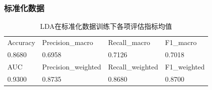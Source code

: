 \documentclass[10pt]{article}
\begin{document}
\subsubsection*{标准化数据}
\begin{table}[H]
  \centering
  \caption{LDA在标准化数据训练下各项评估指标均值}
  \begin{tabular}{llll}
  \toprule
  Accuracy & Precision\_macro & Recall\_macro & F1\_macro \\
  0.8680 & 0.6958 & 0.7126 & 0.7018 \\
  \midrule
  AUC & Precision\_weighted & Recall\_weighted & F1\_weighted \\
  0.9300 & 0.8735 & 0.8680 & 0.8700 \\
  \bottomrule
  \end{tabular}
\end{table}
\end{document}
